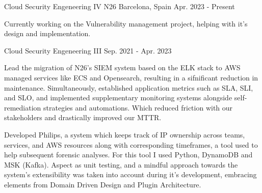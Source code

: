 
\begin{cventries}
\cventry
{Cloud Security Engeneering IV} %
{N26} %
{Barcelona, Spain} %
{Apr. 2023 - Present} %
{
\begin{cvitems} %
\item {Currently working on the Vulnerability management project, helping with it's design and implementation.}
\end{cvitems}
}

\cventry
{Cloud Security Engeneering III} %
{} %
{} %
{Sep. 2021 - Apr. 2023} %
{
\begin{cvitems} %
\item {Lead the migration of N26's SIEM system based on the ELK stack to AWS managed services like ECS and Opensearch, resulting in a sifnificant reduction in maintenance. Simultaneously, established application metrics such as SLA, SLI, and SLO, and implemented supplementary monitoring systems alongside self-remediation strategies and automations. Which reduced friction with our stakeholders and drastically improved our MTTR.}
\item {Developed Philips, a system which keeps track of IP ownership across teams, services, and AWS resources along with corresponding timeframes, a tool used to help subsequent forensic analyses. For this tool I used Python, DynamoDB and MSK (Kafka). Aspect as unit testing, and a mindful approach towards the system's extensibility was taken into account during it's development, embracing elements from Domain Driven Design and Plugin Architecture.}
\end{cvitems}
}


\end{cventries}
